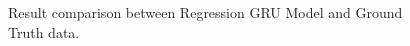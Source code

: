 \begin{figure}
\begin{center}
\end{center}
\decoRule
\caption[Result comparison between Regression GRU Model and Ground Truth data]{Result comparison between Regression GRU Model and Ground Truth data.}
\label{fig:regression-gru-results}
\end{figure}

